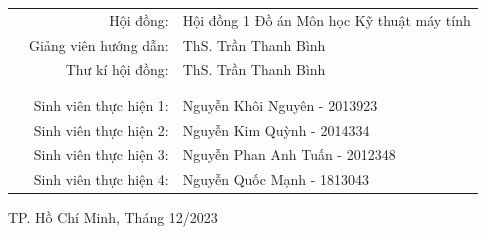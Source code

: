 \documentclass[12pt, a4paper]{report}
\providecommand{\phantomsection}{}
\begin{document}
\begin{titlepage}
\begin{table}[h]
\begin{tabular}{rrl}
\hspace{3.5cm} 
&Hội đồng: &Hội đồng 1 Đồ án Môn học Kỹ thuật máy tính\\
&Giảng viên hướng dẫn: & ThS. Trần Thanh Bình\\
&Thư kí hội đồng: & ThS. Trần Thanh Bình\\ \\ \\
&Sinh viên thực hiện 1:& Nguyễn Khôi Nguyên - 2013923 \\
&Sinh viên thực hiện 2:& Nguyễn Kim Quỳnh - 2014334\\
&Sinh viên thực hiện 3:& Nguyễn Phan Anh Tuấn - 2012348\\
&Sinh viên thực hiện 4:& Nguyễn Quốc Mạnh - 1813043\\
\end{tabular}
\end{table}
\vfill
\begin{center}
\large TP. Hồ Chí Minh, Tháng 12/2023
\end{center}
\end{titlepage}


\thispagestyle{empty}

\newpage


\tableofcontents

\phantomsection{}
\listoftables

\phantomsection{}
\listoffigures

\newpage

\newpage

\newpage

\newpage

\newpage

\newpage

\newpage

\newpage

\newpage




\end{document}
